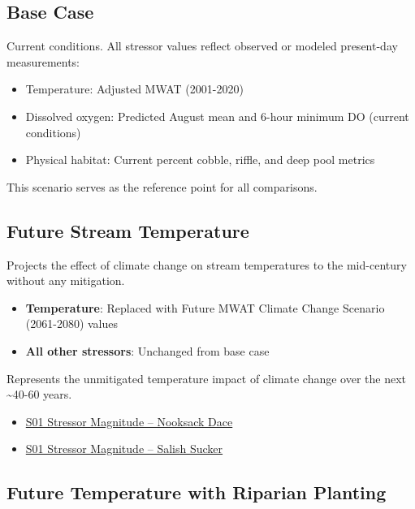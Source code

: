 \documentclass[
  letterpaper,
  DIV=11,
  numbers=noendperiod]{scrreprt}
\providecommand{\tightlist}{%
  \setlength{\itemsep}{0pt}\setlength{\parskip}{0pt}}
\begin{document}
\subsection*{Base Case}\label{base-case}

Current conditions. All stressor values reflect observed or modeled
present-day measurements:

\begin{itemize}
\tightlist
\item
  Temperature: Adjusted MWAT (2001-2020)
\item
  Dissolved oxygen: Predicted August mean and 6-hour minimum DO (current
  conditions)
\item
  Physical habitat: Current percent cobble, riffle, and deep pool
  metrics
\end{itemize}

This scenario serves as the reference point for all comparisons.

\subsection*{Future Stream Temperature}\label{future-stream-temperature}

Projects the effect of climate change on stream temperatures to the
mid-century without any mitigation.

\begin{itemize}
\tightlist
\item
  \textbf{Temperature}: Replaced with Future MWAT Climate Change
  Scenario (2061-2080) values
\item
  \textbf{All other stressors}: Unchanged from base case
\end{itemize}

Represents the unmitigated temperature impact of climate change over the
next \textasciitilde40-60 years.

\begin{itemize}
\tightlist
\item
  \href{./sample_data/ndss_nooksack_dace/S01_Future\%20Stream\%20Temp.xlsx}{S01
  Stressor Magnitude -- Nooksack Dace}
\item
  \href{./sample_data/ndss_salish_sucker/S01_Future\%20Stream\%20Temp.xlsx}{S01
  Stressor Magnitude -- Salish Sucker}
\end{itemize}

\subsection*{Future Temperature with Riparian
Planting}\label{future-temperature-with-riparian-planting}
\end{document}
